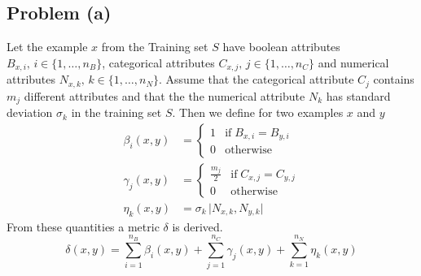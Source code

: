 \subsection*{Problem (a)}

Let the example $x$ from the Training set $S$ have boolean attributes
$B_{x,i},\, i\in\{1,\ldots,n_{B}\}$, categorical attributes $C_{x,j},\, j\in\{1,\ldots,n_{C}\}$
and numerical attributes $N_{x,k},\, k\in\{1,\ldots,n_{N}\}$. Assume
that the categorical attribute $C_{j}$ contains $m_{j}$ different
attributes and that the the numerical attribute $N_{k}$ has standard
deviation $\sigma_{k}$ in the training set $S$. Then we define for
two examples $x$ and $y$
\begin{align*}
\beta_{i}(x,y) & =\begin{cases}
1 & \text{if}\; B_{x,i}=B_{y,i}\\
0 & \text{otherwise}
\end{cases}\\
\gamma_{j}(x,y) & =\begin{cases}
\frac{m_{j}}{2} & \text{if}\; C_{x,j}=C_{y,j}\\
0 & \text{otherwise}
\end{cases}\\
\eta_{k}(x,y) & =\sigma_{k}\,\vert N_{x,k},N_{y,k}\vert
\end{align*}
From these quantities a metric $\delta$ is derived.
\[
\delta(x,y)=\sum_{i=1}^{n_{B}}\beta_{i}(x,y)+\sum_{j=1}^{n_{C}}\gamma_{j}(x,y)+\sum_{k=1}^{n_{N}}\eta_{k}(x,y)
\]